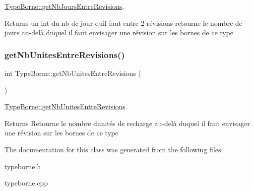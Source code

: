 \hyperlink{class_type_borne_a4921b40e0c20ec1c98ea167cb787e605}{Type\+Borne\+::get\+Nb\+Jours\+Entre\+Revisions}. 

\begin{DoxyReturn}{Returns}
un int du nb de jour qu\textquotesingle{}il faut entre 2 révisions retourne le nombre de jours au-\/delà duquel il faut envisager une révision sur les bornes de ce type 
\end{DoxyReturn}
\mbox{\label{class_type_borne_aa99a6c098973997a77699bea1244a94f}} 
\subsubsection{\texorpdfstring{get\+Nb\+Unites\+Entre\+Revisions()}{getNbUnitesEntreRevisions()}}
{\footnotesize\ttfamily int Type\+Borne\+::get\+Nb\+Unites\+Entre\+Revisions (\begin{DoxyParamCaption}{ }\end{DoxyParamCaption})}



\hyperlink{class_type_borne_aa99a6c098973997a77699bea1244a94f}{Type\+Borne\+::get\+Nb\+Unites\+Entre\+Revisions}. 

\begin{DoxyReturn}{Returns}
Retourne le nombre d\textquotesingle{}unités de recharge au-\/delà duquel il faut envisager une révision sur les bornes de ce type 
\end{DoxyReturn}


The documentation for this class was generated from the following files\+:\begin{DoxyCompactItemize}
\item 
typeborne.\+h\item 
typeborne.\+cpp\end{DoxyCompactItemize}
